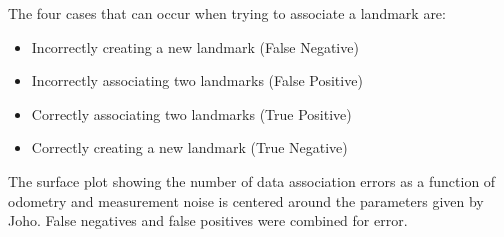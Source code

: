 \documentclass[12pt]{article}
\begin{document}
The four cases that can occur when trying to associate a landmark are: 
\begin{itemize} 
\item Incorrectly creating a new landmark (False Negative)
\item Incorrectly associating two landmarks (False Positive)
\item Correctly associating two landmarks (True Positive)
\item Correctly creating a new landmark (True Negative)
\end{itemize}

The surface plot showing the number of data association errors as a function of odometry and measurement noise is centered around the parameters given by Joho.  False negatives and false positives were combined for error.
\end{document}
